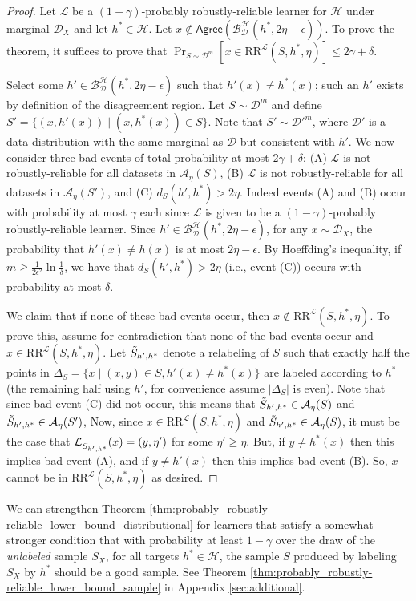 \documentclass[11pt]{article}
\newcommand{\CR}{\text{RR}}
\newcommand{\0}{\mathbf{0}}
\newcommand{\1}{\mathbf{1}}
\newcommand{\cA}{\mathcal{A}}
\newcommand{\cB}{\mathcal{B}}
\newcommand{\cD}{\mathcal{D}}
\newcommand{\cH}{\mathcal{H}}
\newcommand{\cL}{\mathcal{L}}
\newcommand{\Agree}{\mathsf{Agree}}
\begin{document}
\begin{proof}
Let  $\cL$ be a $(1-\gamma)$-probably robustly-reliable learner for $\cH$ under marginal $\cD_X$ and let $h^*\in\cH$.  Let $x\not\in \Agree(\cB_{\cD}^\cH(h^*,2\eta-\epsilon))$. To prove the theorem, it suffices to prove that $\Pr_{S \sim \cD^m}[x \in \CR^\cL(S,h^*,\eta) ] \leq 2\gamma+\delta$.

Select some $h' \in \cB_{\cD}^\cH(h^*,2\eta-\epsilon)$ such that $h'(x)\neq h^*(x)$; such an $h'$ exists by definition of the disagreement region.  Let $S \sim \cD^m$ and define $S'=\{(x,h'(x))\mid (x,h^*(x))\in S\}$. Note that $S'\sim\cD'^m$, where $\cD'$ is a data distribution with the same marginal as $\cD$ but consistent with $h'$.  We now consider three bad events of total probability at most $2\gamma+\delta$: (A) $\cL$ is not robustly-reliable for all datasets in $\cA_\eta(S)$, (B) $\cL$ is not robustly-reliable for all datasets in $\cA_\eta(S')$, and (C) $d_S(h',h^*) > 2\eta$.  Indeed events (A) and (B) occur with probability at most $\gamma$ each since $\cL$ is given to be a $(1-\gamma)$-probably robustly-reliable learner. Since $h' \in \cB_{\cD}^\cH(h^*,2\eta-\epsilon)$, for any $x\sim\cD_X$, the probability that $h'(x)\ne h(x)$ is at most $2\eta-\epsilon$. By Hoeffding's inequality, if $m\ge \frac{1}{2\epsilon^2}\ln\frac{1}{\delta}$, we have that $d_S(h',h^*) > 2\eta$ (i.e., event (C)) occurs with probability at most $\delta$.

We claim that if none of these bad events occur, then $x \not\in \CR^\cL(S,h^*,\eta)$.
To prove this, assume for contradiction that none of the bad events occur and $x \in \CR^\cL(S,h^*,\eta)$. Let $\Tilde{S}_{h',h^*}$ denote a relabeling of $S$ such that exactly half the points in $\Delta_S=\{x\mid (x,y)\in S, h'(x)\ne h^*(x)\}$ are labeled according to $h^*$ (the remaining half using $h'$, for convenience assume $|\Delta_S|$ is even). Note that since bad event (C) did not occur, this means that $\Tilde{S}_{h',h^*} \in \cA_\eta(S)$ and $\Tilde{S}_{h',h^*} \in \cA_\eta(S')$,  Now, since $x \in \CR^\cL(S,h^*,\eta)$ and $\Tilde{S}_{h',h^*} \in \cA_\eta(S)$, it must be the case that $\cL_{\Tilde{S}_{h',h^*}}(x) = (y,\eta')$ for some $\eta'\geq \eta$. But, if $y \neq h^*(x)$ then this implies bad event (A), and if $y \neq h'(x)$ then this implies bad event (B).  So, $x$ cannot be in $\CR^\cL(S,h^*,\eta)$ as desired.
\end{proof}


We can strengthen Theorem \ref{thm:probably_robustly-reliable_lower_bound_distributional} for learners that satisfy a somewhat stronger condition that with probability at least $1-\gamma$ over the draw of the {\em unlabeled} sample $S_X$, for all targets $h^* \in \cH$, the sample $S$ produced by labeling $S_X$ by $h^*$ should be a good sample. See Theorem \ref{thm:probably_robustly-reliable_lower_bound_sample} in Appendix \ref{sec:additional}.
\end{document}
